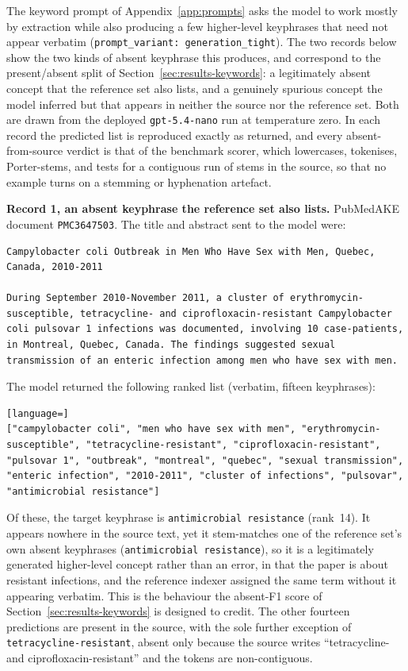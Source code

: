 The keyword prompt of Appendix~\ref{app:prompts} asks the model to work mostly by
extraction while also producing a few higher-level keyphrases that need not appear
verbatim (\lstinline|prompt_variant: generation_tight|). The two records below
show the two kinds of absent keyphrase this produces, and correspond to the
present/absent split of Section~\ref{sec:results-keywords}: a legitimately absent
concept that the reference set also lists, and a genuinely spurious concept the
model inferred but that appears in neither the source nor the reference set. Both
are drawn from the deployed \texttt{gpt-5.4-nano} run at temperature zero. In each
record the predicted list is reproduced exactly as returned, and every
absent-from-source verdict is that of the benchmark scorer, which lowercases,
tokenises, Porter-stems, and tests for a contiguous run of stems in the source, so
that no example turns on a stemming or hyphenation artefact.

\medskip
\noindent\textbf{Record 1, an absent keyphrase the reference set also lists.}
PubMedAKE document \lstinline|PMC3647503|. The title and abstract sent to the
model were:

\begin{lstlisting}
Campylobacter coli Outbreak in Men Who Have Sex with Men, Quebec, Canada, 2010-2011

During September 2010-November 2011, a cluster of erythromycin-susceptible, tetracycline- and ciprofloxacin-resistant Campylobacter coli pulsovar 1 infections was documented, involving 10 case-patients, in Montreal, Quebec, Canada. The findings suggested sexual transmission of an enteric infection among men who have sex with men.
\end{lstlisting}

\noindent The model returned the following ranked list (verbatim, fifteen
keyphrases):

\begin{lstlisting}[language=]
["campylobacter coli", "men who have sex with men", "erythromycin-susceptible", "tetracycline-resistant", "ciprofloxacin-resistant", "pulsovar 1", "outbreak", "montreal", "quebec", "sexual transmission", "enteric infection", "2010-2011", "cluster of infections", "pulsovar", "antimicrobial resistance"]
\end{lstlisting}

\noindent Of these, the target keyphrase is \lstinline|antimicrobial resistance|
(rank~14). It appears nowhere in the source text, yet it stem-matches one of the
reference set's own absent keyphrases (\lstinline|antimicrobial resistance|), so
it is a legitimately generated higher-level concept rather than an error, in that
the paper is about resistant infections, and the reference indexer assigned the same
term without it appearing verbatim. This is the behaviour the absent-F1 score of
Section~\ref{sec:results-keywords} is designed to credit. The other fourteen
predictions are present in the source, with the sole further exception of
\lstinline|tetracycline-resistant|, absent only because the source writes
``tetracycline- and ciprofloxacin-resistant'' and the tokens are non-contiguous.

